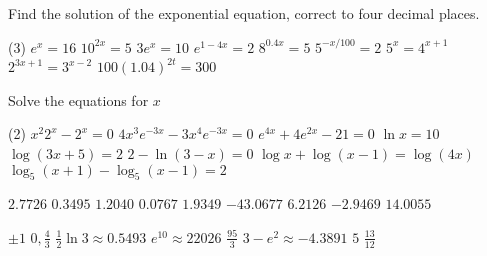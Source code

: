 \begin{Exercise}[title={Logarithmic Equations},label=exLogEqns]
\Question Find the solution of the exponential equation, correct to four decimal places. 
\begin{tasks}(3)
	\task $e^{x} =16$ 		%
	\task $10^{2 x} =5$ 	%
	\task $3 e^{x} =10$ 	%
	\task $e^{1 -4 x} =2$ 	%
	\task $8^{0.4 x} =5$ 	%
	\task $5^{ -x/100} =2$	%
	\task $5^{x} =4^{x +1}$ %
	\task $2^{3 x +1} =3^{x -2}$ 	%
	\task $100 \left (1.04\right )^{2 t} =300$	%
\end{tasks}

\Question Solve the equations for $x$ 
\begin{tasks}(2)
	\task $x^{2} 2^{x} -2^{x} =0$ %
	\task $4 x^{3} e^{ -3 x} -3 x^{4} e^{ -3 x} =0$%
	\task $e^{4 x} +4 e^{2 x} -21 =0$ %
	\task $\ln  x =10$ %
	\task $\log  \left (3 x +5\right ) =2$%
	\task $2 -\ln  \left (3 -x\right ) =0$%
	\task $\log  x +\log  \left (x -1\right ) =\log  \left (4 x\right )$ %
	\task $\log _{5} \left (x +1\right ) -\log _{5} \left (x -1\right ) =2$ %
\end{tasks}	
\end{Exercise}
\begin{Answer}[ref={exLogEqns}]
\Question %
\begin{tasks}
	\task $2.7726$
	\task $0.3495$ 
	\task $1.2040$ 
	\task $0.0767$
	\task $1.9349$
	\task $ -43.0677$ 
	\task $6.2126$
	\task $ -2.9469$ 
	\task $14.0055$ 
\end{tasks}

\Question %
\begin{tasks}
	\task $ \pm 1$
	\task $0 ,\frac{4}{3}$ 
	\task $\frac{1}{2} \ln  3 \approx 0.5493$
	\task $e^{10} \approx 22026$ 
	\task $\frac{95}{3}$ 
	\task $3 -e^{2} \approx  -4.3891$ 
	\task $5$ 
	\task $\frac{13}{12}$ 
\end{tasks}		
	
\end{Answer}%
